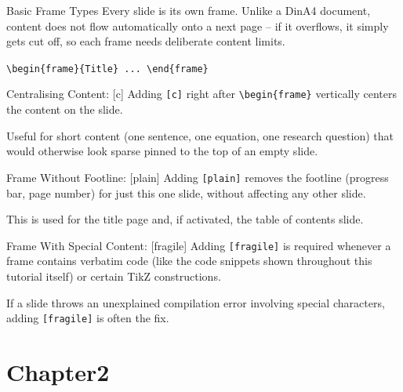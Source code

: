 \begin{frame}{Basic Frame Types}
Every slide is its own frame. Unlike a DinA4 document, content does not flow automatically onto a next page -- if it overflows, it simply gets cut off, so each frame needs deliberate content limits.

\vspace{0.3cm}
\texttt{\textbackslash begin\{frame\}\{Title\} ... \textbackslash end\{frame\}}
\end{frame}

\begin{frame}[c]{Centralising Content: [c]}
Adding \texttt{[c]} right after \texttt{\textbackslash begin\{frame\}} vertically centers the content on the slide.

\vspace{0.3cm}
Useful for short content (one sentence, one equation, one research question) that would otherwise look sparse pinned to the top of an empty slide.
\end{frame}

\begin{frame}[plain]{Frame Without Footline: [plain]}
Adding \texttt{[plain]} removes the footline (progress bar, page number) for just this one slide, without affecting any other slide.

\vspace{0.3cm}
This is used for the title page and, if activated, the table of contents slide.
\end{frame}

\begin{frame}[fragile]{Frame With Special Content: [fragile]}
Adding \texttt{[fragile]} is required whenever a frame contains verbatim code (like the code snippets shown throughout this tutorial itself) or certain TikZ constructions.

\vspace{0.3cm}
If a slide throws an unexplained compilation error involving special characters, adding \texttt{[fragile]} is often the fix.
\end{frame}

\section{Chapter2}

